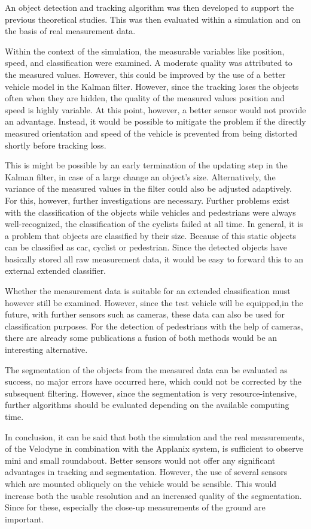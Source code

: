 \documentclass[11pt,oneside,openright]{mpreport}
\begin{document}
An object detection and tracking algorithm was then developed to support the previous theoretical studies.
This was then evaluated within a simulation and on the basis of real measurement data.

Within the context of the simulation, the measurable variables like position, speed, and classification were examined.
A moderate quality was attributed to the measured values.
However, this could be improved by the use of a better vehicle model in the Kalman filter.
However, since the tracking loses the objects often when they are hidden, the quality of the measured
values position and speed is highly variable. At this point, however, a better sensor would not provide an advantage.
Instead, it would be possible to mitigate the problem if the directly measured orientation and speed of the vehicle
is prevented from being distorted shortly before tracking loss.

This is might be possible by an early termination of the updating step in the Kalman filter,
in case of a large change an object's size. Alternatively, the variance of the measured values in the
filter could also be adjusted adaptively. For this, however, further investigations are necessary.
Further problems exist with the classification of the objects while vehicles and pedestrians were always well-recognized,
the classification of the cyclists failed at all time. In general, it is a problem that objects are classified by their size.
Because of this static objects can be classified as car, cyclist or pedestrian.
Since the detected objects have basically stored all raw measurement data, it would be easy to forward this
to an external extended classifier. 

Whether the measurement data is suitable for an extended classification must however still be examined.
However, since the test vehicle will be equipped,in the future, with further sensors such as cameras, 
these data can also be used for classification purposes. 
For the detection of pedestrians with the help of cameras, there are already some publications \cite{Lee2015, Tuong2011} 
a fusion of both methods would be an interesting alternative.


The segmentation of the objects from the measured data can be evaluated as success, 
no major errors have occurred here, which could not be corrected by the subsequent filtering.
However, since the segmentation is very resource-intensive, further algorithms should be evaluated depending on 
the available computing time.


In conclusion, it can be said that both the simulation and the real measurements,
of the Velodyne in combination with the Applanix system,
is sufficient to observe mini and small roundabout.
Better sensors would not offer any significant advantages in tracking and segmentation.
However, the use of several sensors which are mounted obliquely on the vehicle would be sensible.
This would increase both the usable resolution and an increased quality of the segmentation.
Since for these, especially the close-up measurements of the ground are important.






\printbibliography
\end{document}
